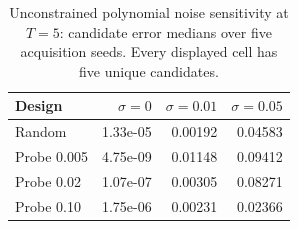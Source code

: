 \begin{table}[tb]
\centering\small
\caption{Unconstrained polynomial noise sensitivity at $T=5$: candidate error medians over five acquisition seeds. Every displayed cell has five unique candidates.}\label{tab:noise}
\begin{tabular}{lrrr}\toprule
Design & $\sigma=0$ & $\sigma=0.01$ & $\sigma=0.05$ \\
\midrule
Random & 1.33e-05 & 0.00192 & 0.04583\\
Probe 0.005 & 4.75e-09 & 0.01148 & 0.09412\\
Probe 0.02 & 1.07e-07 & 0.00305 & 0.08271\\
Probe 0.10 & 1.75e-06 & 0.00231 & 0.02366\\
\bottomrule\end{tabular}
\end{table}

